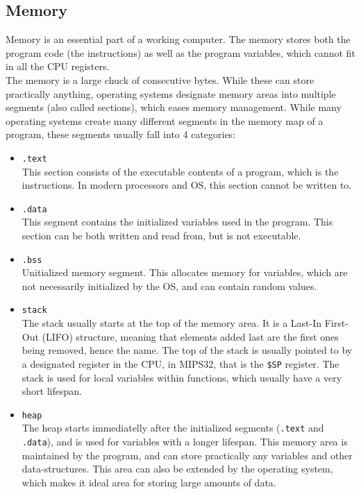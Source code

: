 \subsection{Memory}
Memory is an essential part of a working computer. The memory stores both the
program code (the instructions) as well as the program variables, which cannot
fit in all the CPU registers.\\
The memory is a large chuck of consecutive bytes. While these can store
practically anything, operating systems designate memory areas into multiple
segments (also called sections), which eases memory management.
While many operating systems create many different segments in the memory map
of a program, these segments usually fall into 4 categories\cite{memory_sections}:
\begin{itemize}
\item \texttt{.text}\\
This section consists of the executable contents of a program, which is the
instructions. In modern processors and OS, this section cannot be written to.
\item \texttt{.data}\\
This segment contains the initialized variables used in the program. This section
can be both written and read from, but is not executable.
\item \texttt{.bss}\\
Unitialized memory segment. This allocates memory for variables, which are not
necessarily initialized by the OS, and can contain random values.

\item \texttt{stack}\\
The stack usually starts at the top of the memory area.
It is a Last-In First-Out (LIFO) structure, meaning that elements added last are
the first ones being removed, hence the name.
The top of the stack is usually pointed to by a designated register in the CPU, in MIPS32, that is
the \texttt{\$SP} register. The stack is used for local variables within
functions, which usually have a very short lifespan.

\item \texttt{heap}\\
The heap starts immediatelly after the initialized segments (\texttt{.text} and
\texttt{.data}), and is used for variables with a longer lifespan. This memory
area is maintained by the program, and can store practically any variables and
other data-structures. This area can also be extended by the operating system,
which makes it ideal area for storing large amounts of data.
\end{itemize}

